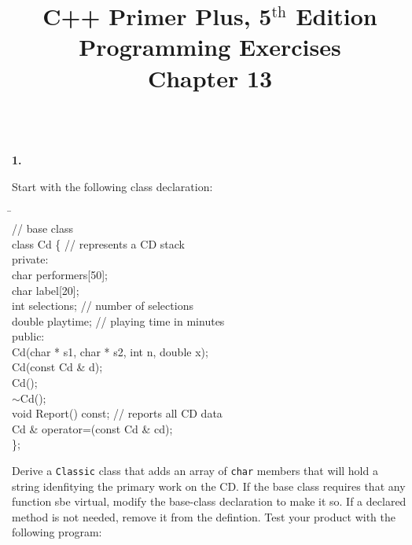 \documentclass[10 pt]{amsart}
\newlength{\cwidth}
\newenvironment{cpart}[2][\cwidth]
	{%
		\\ %
		\textbf{#2. }%
		\begin{minipage}[t]{#1}%
		\setlength{\parindent}{0pt}%
		\setlength{\parskip}{2ex}%
	}
	{%
		\end{minipage}%
	}
\newcommand{\ttt}[1]{\texttt{#1}}
\newcommand{\ChapNum}{13}
\begin{document}
	\title
	[Chapter \ChapNum]
	{C++ Primer Plus, 5$^\text{th}$ Edition \\
	Programming Exercises \\
	Chapter \ChapNum}

	\maketitle

	\begin{cpart}{1}
		Start with the following class declaration:
		{\ttfamily
			\begin{tabbing}
				\phantom{\qquad}\=\hspace{4 cm}\= \\
				// base class \\
				class Cd \{  // represents a CD stack \\
				private: 
				\+ \\
				char performers[50]; \\
				char label[20]; \\
				int selections; \> // number of selections \\
				double playtime; \> // playing time in minutes \\
				\< public: \\
				Cd(char * s1, char * s2, int n, double x); \\
				Cd(const Cd & d); \\
				Cd(); \\
				$\sim$Cd(); \\
				void Report() const; \quad // reports all CD data \\
				Cd \& operator=(const Cd \& cd); \\
				\< \};
			\end{tabbing}
		}
		Derive a \ttt{Classic} class that adds an array of \ttt{char}
		members that will hold a string idenfitying the primary work
		on the CD.
		If the base class requires that any function sbe virtual, modify
		the base-class declaration to make it so.
		If a declared method is not needed, remove it from the
		defintion. 
		Test your product with the following program:
	\end{cpart}
	\newpage
\end{document}
